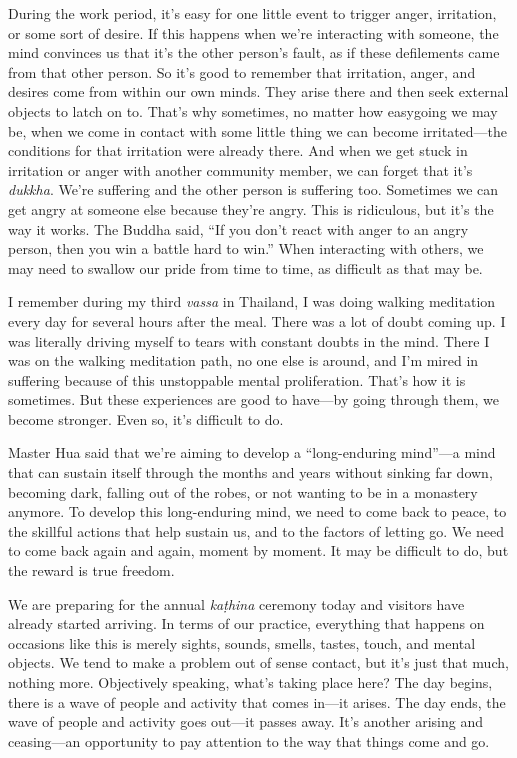 During the work period, it's easy for one little event to trigger 
anger, irritation, or some sort of desire. If this happens when we're 
interacting with someone, the mind convinces us that it's the other 
person's fault, as if these defilements came from that other person. So 
it's good to remember that irritation, anger, and desires come from 
within our own minds. They arise there and then seek external objects 
to latch on to. That's why sometimes, no matter how easygoing we may 
be, when we come in contact with some little thing we can become 
irritated---the conditions for that irritation were already there. And 
when we get stuck in irritation or anger with another community member, 
we can forget that it's \emph{dukkha}. We're suffering and the other 
person is suffering too. Sometimes we can get angry at someone else 
because they're angry. This is ridiculous, but it's the way it works. 
The Buddha said, ``If you don't react with anger to an angry person, 
then you win a battle hard to win.'' When interacting with others, we 
may need to swallow our pride from time to time, as difficult as that 
may be.

I remember during my third \emph{vassa} in Thailand, I was doing 
walking meditation every day for several hours after the meal. There 
was a lot of doubt coming up. I was literally driving myself to tears 
with constant doubts in the mind. There I was on the walking meditation 
path, no one else is around, and I'm mired in suffering because of this 
unstoppable mental proliferation. That's how it is sometimes. But these 
experiences are good to have---by going through them, we become 
stronger. Even so, it's difficult to do.

Master Hua said that we're aiming to develop a ``long-enduring 
mind''---a mind that can sustain itself through the months and years 
without sinking far down, becoming dark, falling out of the robes, or 
not wanting to be in a monastery anymore. To develop this long-enduring 
mind, we need to come back to peace, to the skillful actions that help 
sustain us, and to the factors of letting go. We need to come back 
again and again, moment by moment. It may be difficult to do, but the 
reward is true freedom.


We are preparing for the annual \emph{kaṭhina} ceremony today and 
visitors have already started arriving. In terms of our practice, 
everything that happens on occasions like this is merely sights, 
sounds, smells, tastes, touch, and mental objects. We tend to make a 
problem out of sense contact, but it's just that much, nothing more. 
Objectively speaking, what's taking place here? The day begins, there 
is a wave of people and activity that comes in---it arises. The day 
ends, the wave of people and activity goes out---it passes away. It's 
another arising and ceasing---an opportunity to pay attention to the 
way that things come and go.

